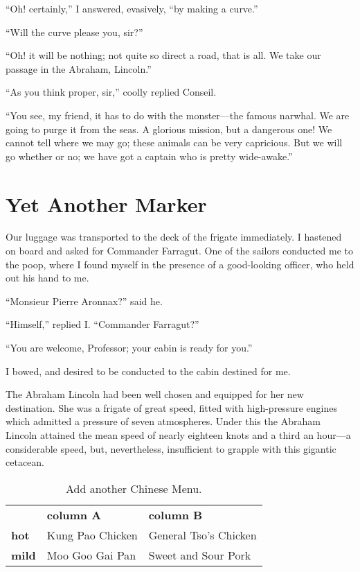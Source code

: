 ``Oh! certainly,'' I answered, evasively, ``by making a curve.''

``Will the curve please you, sir?''

``Oh! it will be nothing; not quite so direct a road, that is all.
We take our passage in the Abraham, Lincoln.''

``As you think proper, sir,'' coolly replied Conseil.

``You see, my friend, it has to do with the monster---the
famous narwhal.  We are going to purge it from the seas.
A glorious mission, but a dangerous one!  We cannot tell
where we may go; these animals can be very capricious.
But we will go whether or no; we have got a captain who
is pretty wide-awake.''

\section{Yet Another Marker}

Our luggage was transported to the deck of the frigate immediately.
I hastened on board and asked for Commander Farragut.
One of the sailors conducted me to the poop, where I found myself
in the presence of a good-looking officer, who held out his
hand to me.

``Monsieur Pierre Aronnax?'' said he.

``Himself,'' replied I. ``Commander Farragut?''

``You are welcome, Professor; your cabin is ready for you.''

I bowed, and desired to be conducted to the cabin destined for me.

The Abraham Lincoln had been well chosen and equipped
for her new destination.  She was a frigate of great speed,
fitted with high-pressure engines which admitted a pressure
of seven atmospheres.  Under this the Abraham Lincoln attained
the mean speed of nearly eighteen knots and a third an hour---a
considerable speed, but, nevertheless, insufficient to grapple
with this gigantic cetacean.

\vskip 0.25in
\begin{table}%
 \caption[Add another table]{Add another Chinese Menu.}
 \begin{center}
  \begin{tabular}{lp{4.4cm}p{4.4cm}}
                & \textbf{column A} & \textbf{column B} \\
  \textbf{hot}  & Kung Pao Chicken  & General Tso's Chicken \\
  \textbf{mild} & Moo Goo Gai Pan   & Sweet and Sour Pork
  \end{tabular}
  \label{tab:test2}
 \end{center}
\end{table}

